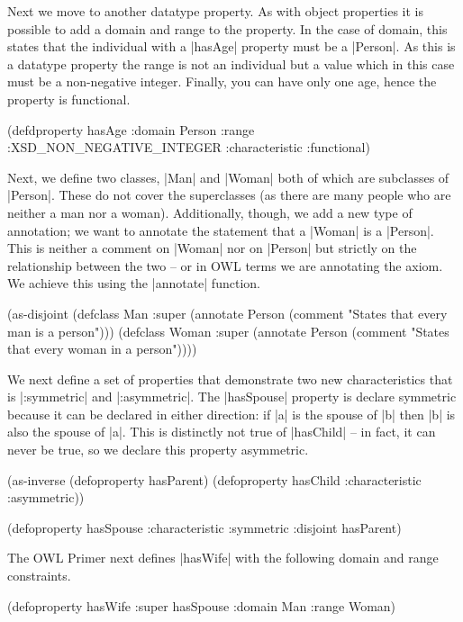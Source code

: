 Next we move to another datatype property. As with object properties
it is possible to add a domain and range to the property. In the case
of domain, this states that the individual with a |hasAge| property
must be a |Person|. As this is a datatype property the range is not an
individual but a value which in this case must be a non-negative
integer. Finally, you can have only one age, hence the property is
functional.

\begin{tawny}
(defdproperty hasAge
  :domain Person
  :range :XSD_NON_NEGATIVE_INTEGER
  :characteristic :functional)
\end{tawny}

Next, we define two classes, |Man| and |Woman| both of which are
subclasses of |Person|. These do not cover the superclasses (as there
are many people who are neither a man nor a woman). Additionally,
though, we add a new type of annotation; we want to annotate the
statement that a |Woman| is a |Person|. This is neither a comment on
|Woman| nor on |Person| but strictly on the relationship between the
two -- or in OWL terms we are annotating the axiom. We achieve this
using the |annotate| function.

\begin{tawny}
(as-disjoint
 (defclass Man
   :super
   (annotate Person
             (comment "States that every man is a person")))
 (defclass Woman
   :super
   (annotate Person
             (comment "States that every woman in a person"))))
\end{tawny}

We next define a set of properties that demonstrate two new
characteristics that is |:symmetric| and |:asymmetric|. The
|hasSpouse| property is declare symmetric because it can be declared
in either direction: if |a| is the spouse of |b| then |b| is also the
spouse of |a|. This is distinctly not true of |hasChild| -- in fact,
it can never be true, so we declare this property asymmetric.

\begin{tawny}
(as-inverse
 (defoproperty hasParent)
 (defoproperty hasChild
   :characteristic :asymmetric))

(defoproperty hasSpouse
  :characteristic :symmetric
  :disjoint hasParent)
\end{tawny}

The OWL Primer next defines |hasWife| with the following domain and
range constraints.

\begin{tawnyexample}
(defoproperty hasWife
  :super hasSpouse
  :domain Man :range Woman)
\end{tawnyexample}

